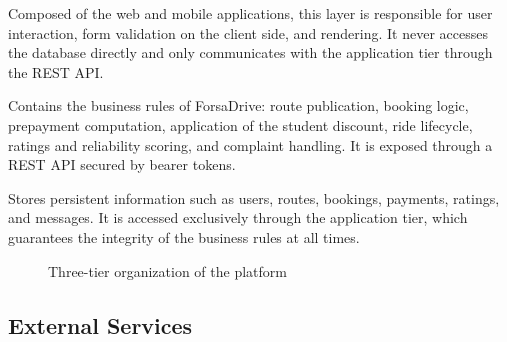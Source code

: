 \begin{description}[noitemsep]
    \item[Presentation tier.] Composed of the web and mobile applications, this layer is responsible for user interaction, form validation on the client side, and rendering. It never accesses the database directly and only communicates with the application tier through the REST API.
    \item[Application tier.] Contains the business rules of ForsaDrive: route publication, booking logic, prepayment computation, application of the student discount, ride lifecycle, ratings and reliability scoring, and complaint handling. It is exposed through a REST API secured by bearer tokens.
    \item[Data tier.] Stores persistent information such as users, routes, bookings, payments, ratings, and messages. It is accessed exclusively through the application tier, which guarantees the integrity of the business rules at all times.
\end{description}

\begin{figure}[H]
    \centering
    \caption{Three-tier organization of the platform}
    \label{fig:three_tier_architecture}
\end{figure}

\subsection{External Services}

